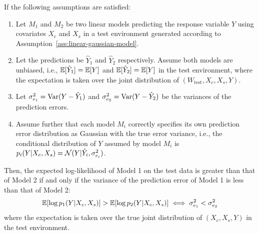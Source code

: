 \documentclass[../thesis.tex]{subfiles}
\begin{document}
\begin{lemma}
\label{lem:loglike_vs_variance}
If the following assumptions are satisfied:
\begin{enumerate}
    \item Let $M_1$ and $M_2$ be two linear models predicting the response variable $Y$ using covariates $X_c$ and $X_s$ in a test environment generated according to Assumption~\ref{ass:linear-gaussian-model}.
    \item Let the predictions be $\hat{Y}_1$ and $\hat{Y}_2$ respectively. Assume both models are unbiased, i.e., $\mathbb{E}[\hat{Y}_1] = \mathbb{E}[Y]$ and $\mathbb{E}[\hat{Y}_2] = \mathbb{E}[Y]$ in the test environment, where the expectation is taken over the joint distribution of $(W_{\text{test}}, X_c, X_s, Y)$.
    \item Let $\sigma^2_{e_1} = \mathrm{Var}(Y - \hat{Y}_1)$ and $\sigma^2_{e_2} = \mathrm{Var}(Y - \hat{Y}_2)$ be the variances of the prediction errors.
    \item Assume further that each model $M_i$ correctly specifies its own prediction error distribution as Gaussian with the true error variance, i.e., the conditional distribution of $Y$ assumed by model $M_i$ is $p_i(Y | X_c, X_s) = \mathcal{N}(Y | \hat{Y}_i, \sigma^2_{e_i})$.
\end{enumerate}

Then, the expected log-likelihood of Model 1 on the test data is greater than that of Model 2 if and only if the variance of the prediction error of Model 1 is less than that of Model 2:
$$ \mathbb{E}[\log p_1(Y | X_c, X_s)] > \mathbb{E}[\log p_2(Y | X_c, X_s)] \iff \sigma^2_{e_1} < \sigma^2_{e_2} $$
where the expectation is taken over the true joint distribution of $(X_c, X_s, Y)$ in the test environment.
\end{lemma}
\end{document}
